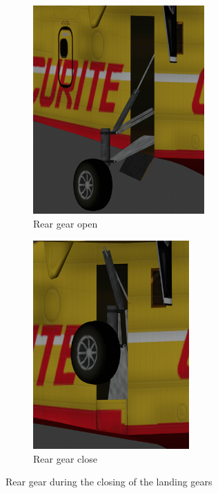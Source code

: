 \documentclass{article}
\begin{document}
\begin{figure}[h!]
  \centering
  \begin{subfigure}[h!]{0.4\linewidth}
    \includegraphics[height=80mm]{postopen.png}
    \caption{Rear gear open}
  \end{subfigure}
  \begin{subfigure}[h!]{0.4\linewidth}
    \includegraphics[height=80mm]{postclose.png}
    \caption{Rear gear close}
  \end{subfigure}
  \caption{Rear gear during the closing of the landing gears}
\end{figure}

\newpage
\end{document}
